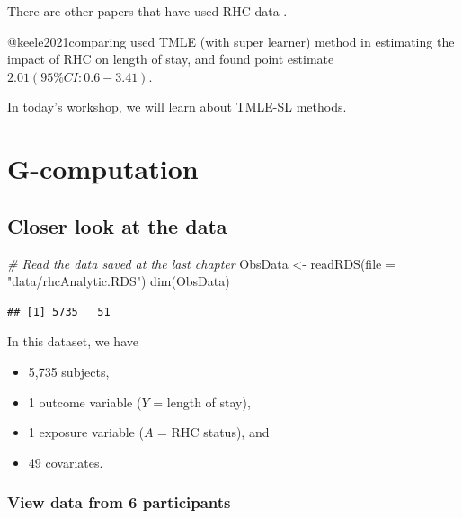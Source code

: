\documentclass[
]{book}
\newenvironment{Shaded}{\begin{snugshade}}{\end{snugshade}}
\newcommand{\AttributeTok}[1]{\textcolor[rgb]{0.77,0.63,0.00}{#1}}
\newcommand{\CommentTok}[1]{\textcolor[rgb]{0.56,0.35,0.01}{\textit{#1}}}
\newcommand{\FunctionTok}[1]{\textcolor[rgb]{0.00,0.00,0.00}{#1}}
\newcommand{\NormalTok}[1]{#1}
\newcommand{\OtherTok}[1]{\textcolor[rgb]{0.56,0.35,0.01}{#1}}
\newcommand{\StringTok}[1]{\textcolor[rgb]{0.31,0.60,0.02}{#1}}
\providecommand{\tightlist}{%
  \setlength{\itemsep}{0pt}\setlength{\parskip}{0pt}}
\begin{document}
There are other papers that have used RHC data \citep{keele2021comparing, keele2018pre}.

\begin{rmdcomment}
@keele2021comparing used TMLE (with super learner) method in estimating
the impact of RHC on length of stay, and found point estimate
\(2.01 (95\% CI: 0.6-3.41)\).
\end{rmdcomment}

In today's workshop, we will learn about TMLE-SL methods.

\hypertarget{g-computation}{%
\chapter{G-computation}\label{g-computation}}

\hypertarget{closer-look-at-the-data}{%
\section{Closer look at the data}\label{closer-look-at-the-data}}

\begin{Shaded}
\begin{Highlighting}[]
\CommentTok{\# Read the data saved at the last chapter}
\NormalTok{ObsData }\OtherTok{\textless{}{-}} \FunctionTok{readRDS}\NormalTok{(}\AttributeTok{file =} \StringTok{"data/rhcAnalytic.RDS"}\NormalTok{)}
\FunctionTok{dim}\NormalTok{(ObsData)}
\end{Highlighting}
\end{Shaded}

\begin{verbatim}
## [1] 5735   51
\end{verbatim}

In this dataset, we have

\begin{itemize}
\tightlist
\item
  5,735 subjects,
\item
  1 outcome variable (\(Y\) = length of stay),
\item
  1 exposure variable (\(A\) = RHC status), and
\item
  49 covariates.
\end{itemize}

\hypertarget{view-data-from-6-participants}{%
\subsection{View data from 6 participants}\label{view-data-from-6-participants}}
\end{document}
